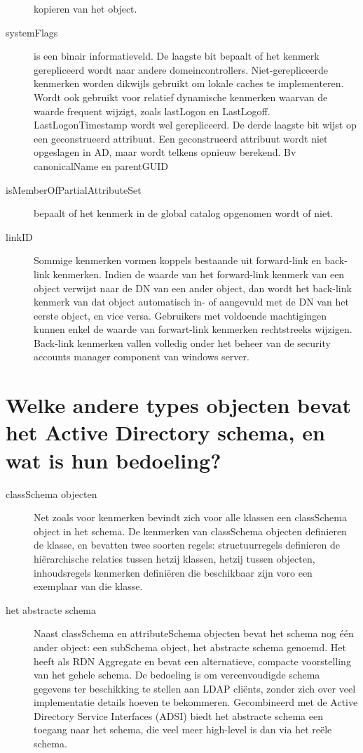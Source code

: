 \begin{description}
		kopieren van het object.
	\item[systemFlags] is een binair informatieveld. De laagste bit bepaalt
		of het kenmerk gerepliceerd wordt naar andere domeincontrollers.
		Niet-gerepliceerde kenmerken worden dikwijls gebruikt om lokale
		caches te implementeren. Wordt ook gebruikt voor relatief
		dynamische kenmerken waarvan de waarde frequent wijzigt, zoals
		lastLogon en LastLogoff. LastLogonTimestamp wordt wel
		gerepliceerd.
		De derde laagste bit wijst op een geconstrueerd attribuut. Een
		geconstrueerd attribuut wordt niet opgeslagen in AD, maar wordt
		telkens opnieuw berekend. Bv canonicalName en parentGUID
	\item[isMemberOfPartialAttributeSet] bepaalt of het kenmerk in de global
		catalog opgenomen wordt of niet.
	\item[linkID] Sommige kenmerken vormen koppels bestaande uit
		forward-link en back-link kenmerken. Indien de waarde van het
		forward-link kenmerk van een object verwijst naar de DN van een
		ander object, dan wordt het back-link kenmerk van dat object
		automatisch in- of aangevuld met de DN van het eerste object, en
		vice versa. Gebruikers met voldoende machtigingen kunnen enkel
		de waarde van forwart-link kenmerken rechtstreeks wijzigen.
		Back-link kenmerken vallen volledig onder het beheer van de
		security accounts manager component van windows server.
\end{description}

\section{Welke andere types objecten bevat het Active Directory schema, en wat
is hun bedoeling?}

\begin{description}
	\item[classSchema objecten] Net zoals voor kenmerken bevindt zich voor
		alle klassen een classSchema object in het schema. De kenmerken
		van classSchema objecten definieren de klasse, en bevatten twee
		soorten regels: structuurregels definieren de hiërarchische
		relaties tussen hetzij klassen, hetzij tussen objecten,
		inhoudsregels kenmerken definiëren die beschikbaar zijn voro een
		exemplaar van die klasse.
	\item[het abstracte schema] Naast classSchema en attributeSchema
		objecten bevat het schema nog één ander object: een subSchema
		object, het abstracte schema genoemd. Het heeft als RDN
		Aggregate en bevat een alternatieve, compacte voorstelling van
		het gehele schema. De bedoeling is om vereenvoudigde schema
		gegevens ter beschikking te stellen aan LDAP cliënts, zonder
		zich over veel implementatie details hoeven te bekommeren.
		Gecombineerd met de Active Directory Service Interfaces (ADSI)
		biedt het abstracte schema een toegang naar het schema, die veel
		meer high-level is dan via het reële schema.
\end{description}

